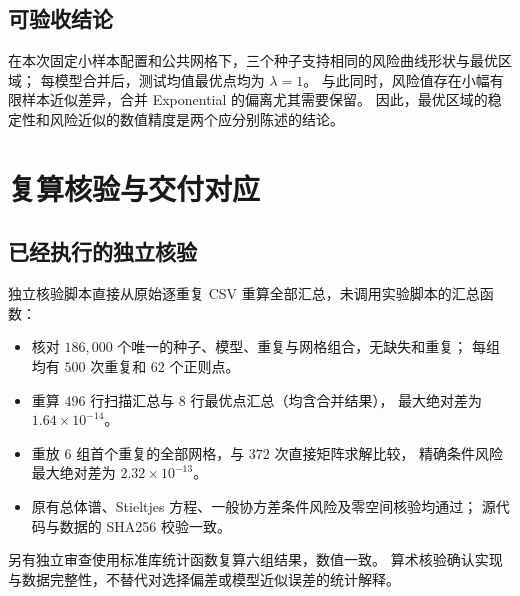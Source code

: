 \documentclass[UTF8,fontset=fandol,a4paper,zihao=-4]{ctexart}
\numberwithin{equation}{section}
\begin{document}
\subsection{可验收结论}
在本次固定小样本配置和公共网格下，三个种子支持相同的风险曲线形状与最优区域；
每模型合并后，测试均值最优点均为 $\lambda=1$。
与此同时，风险值存在小幅有限样本近似差异，合并 Exponential 的偏离尤其需要保留。
因此，最优区域的稳定性和风险近似的数值精度是两个应分别陈述的结论。

\clearpage
\section{复算核验与交付对应}\label{sec:verification}
\subsection{已经执行的独立核验}
独立核验脚本直接从原始逐重复 CSV 重算全部汇总，未调用实验脚本的汇总函数：
\begin{itemize}
 \item 核对 $186{,}000$ 个唯一的种子、模型、重复与网格组合，无缺失和重复；
 每组均有 $500$ 次重复和 $62$ 个正则点。
 \item 重算 $496$ 行扫描汇总与 $8$ 行最优点汇总（均含合并结果），
 最大绝对差为 $1.64\times10^{-14}$。
 \item 重放 $6$ 组首个重复的全部网格，与 $372$ 次直接矩阵求解比较，
 精确条件风险最大绝对差为 $2.32\times10^{-13}$。
 \item 原有总体谱、Stieltjes 方程、一般协方差条件风险及零空间核验均通过；
 源代码与数据的 SHA256 校验一致。
\end{itemize}
另有独立审查使用标准库统计函数复算六组结果，数值一致。
算术核验确认实现与数据完整性，不替代对选择偏差或模型近似误差的统计解释。
\end{document}
